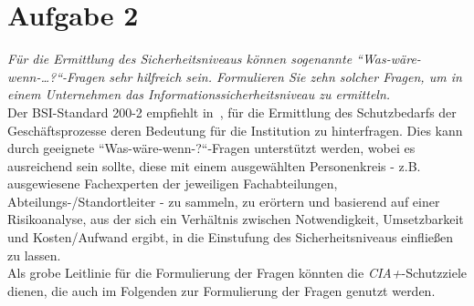\chapter{Aufgabe 2}

\textit{Für die Ermittlung des Sicherheitsniveaus können sogenannte ``Was-wäre-wenn-\ldots?``-Fragen sehr hilfreich sein. Formulieren Sie zehn solcher Fragen, um in einem Unternehmen das Informationssicherheitsniveau zu ermitteln.}\\

\noindent
Der BSI-Standard 200-2 empfiehlt in~\cite[110]{BSI200-2}, für die Ermittlung des Schutzbedarfs der Geschäftsprozesse deren Bedeutung für die Institution zu hinterfragen.
Dies kann durch geeignete ``Was-wäre-wenn-?``-Fragen unterstützt werden, wobei es ausreichend sein sollte, diese mit einem ausgewählten Personenkreis - z.B. ausgewiesene Fachexperten der jeweiligen Fachabteilungen, Abteilungs-/Standortleiter - zu sammeln, zu erörtern und basierend auf einer Risikoanalyse, aus der sich ein Verhältnis zwischen Notwendigkeit, Umsetzbarkeit und Kosten/Aufwand ergibt, in die Einstufung des Sicherheitsniveaus einfließen zu lassen.\\

\noindent
Als grobe Leitlinie für die Formulierung der Fragen könnten die \textit{CIA+}-Schutzziele dienen, die auch im Folgenden zur Formulierung der Fragen genutzt werden.

